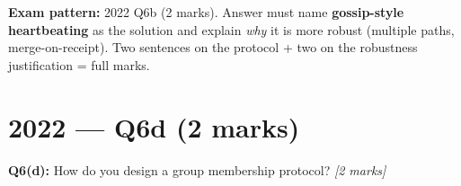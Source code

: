 \documentclass[12pt,a4paper]{article}
\begin{document}
\begin{notesbox}
\textbf{Exam pattern:} 2022 Q6b (2 marks). Answer must name \textbf{gossip-style heartbeating}
as the solution and explain \emph{why} it is more robust (multiple paths, merge-on-receipt).
Two sentences on the protocol + two on the robustness justification = full marks.
\end{notesbox}

\newpage
\section{2022 — Q6d (2 marks)}

\begin{qbox}
\textbf{Q6(d):} How do you design a group membership protocol?
\hfill \textit{[2 marks]}
\end{qbox}
\end{document}
